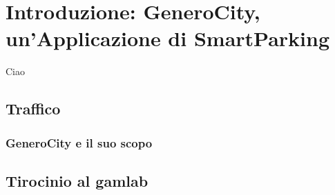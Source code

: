 \chapter{Introduzione: GeneroCity, un'Applicazione di SmartParking}
Ciao \citep{guit}

\section{Traffico}
\subsection{GeneroCity e il suo scopo}

\section{Tirocinio al gamlab}


